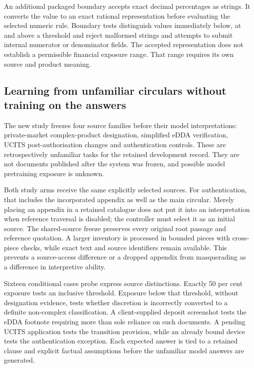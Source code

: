 An additional packaged boundary accepts exact decimal percentages as strings.
It converts the value to an exact rational representation before evaluating the
selected numeric rule. Boundary tests distinguish values immediately below,
at and above a threshold and reject malformed strings and attempts to submit
internal numerator or denominator fields. The accepted representation does not
establish a permissible financial exposure range. That range requires its own
source and product meaning.

\subsection{Learning from unfamiliar circulars without training on the answers}

The new study freezes four source families before their model interpretations:
private-market complex-product designation, simplified eDDA verification, UCITS
post-authorisation changes and authentication controls. These are retrospectively
unfamiliar tasks for the retained development record. They are not documents
published after the system was frozen, and possible model pretraining exposure
is unknown.

Both study arms receive the same explicitly selected sources. For authentication,
that includes the incorporated appendix as well as the main circular. Merely
placing an appendix in a retained catalogue does not put it into an interpretation
when reference traversal is disabled; the controller must select it as an initial
source. The shared-source freeze preserves every original root passage and
reference quotation. A larger inventory is processed in bounded pieces with
cross-piece checks, while exact text and source identifiers remain available.
This prevents a source-access difference or a dropped appendix from masquerading
as a difference in interpretive ability.

Sixteen conditional cases probe express source distinctions. Exactly 50 per
cent exposure tests an inclusive threshold. Exposure below that threshold,
without designation evidence, tests whether discretion is incorrectly converted
to a definite non-complex classification. A client-supplied deposit screenshot
tests the eDDA footnote requiring more than sole reliance on such documents.
A pending UCITS application tests the transition provision, while an already
bound device tests the authentication exception. Each expected answer is tied
to a retained clause and explicit factual assumptions before the unfamiliar
model answers are generated.

